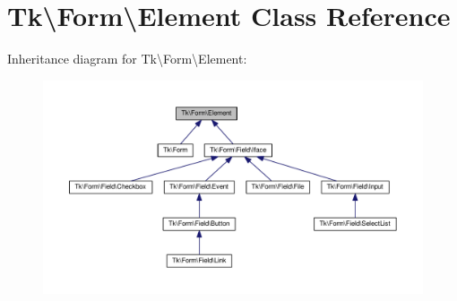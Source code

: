 \hypertarget{classTk_1_1Form_1_1Element}{\section{Tk\textbackslash{}Form\textbackslash{}Element Class Reference}
\label{classTk_1_1Form_1_1Element}
}


Inheritance diagram for Tk\textbackslash{}Form\textbackslash{}Element\+:\nopagebreak
\begin{figure}[H]
\begin{center}
\leavevmode
\includegraphics[width=350pt]{classTk_1_1Form_1_1Element__inherit__graph}
\end{center}
\end{figure}
